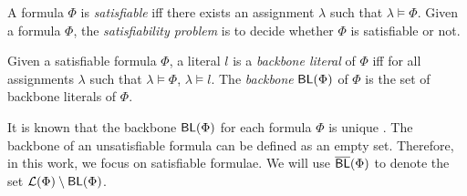 \iffalse
An assignment $\lambda$ is a \emph{model} of $\Phi$ if $\lambda\models \Phi$.
Given two models $\lambda_1$ and $\lambda_2$ of $\Phi$, $\lambda_2$ can be \emph{generated} from $\lambda_1$, denoted by $\lambda_1\Rightarrow_\Phi\lambda_2$, if there exists a literal $l$ such that $\lambda_2=\lambda_1[\neg l]$.
Let $\Rightarrow^*_\Phi$ denote the \emph{reflexive transitive} closure of $\Rightarrow_\Phi$.
Formally, for every model $\lambda$ of $\Phi$, $\lambda\Rightarrow^*_\Phi\lambda$ and $\lambda_1\Rightarrow^*_\Phi\lambda_3$ if $\lambda_1\Rightarrow^*_\Phi\lambda_2$ and $\lambda_2\Rightarrow^*_\Phi\lambda_3$.
A \emph{model cluster} $\cl_\Phi(\lambda)$ of $\lambda$ is the set of models $\{\lambda'\mid \lambda\Rightarrow^*_\Phi\lambda'\}$.
A literal $l$ is a \emph{frozen literal} in a model $\lambda$ of $\Phi$,
if $l$ takes the same value in all the models of $\cl_\Phi(\lambda)$. Let $\FL(\Phi,\lambda)$ denote the set of all the frozen literals
in the model $\lambda$ of $\Phi$. %
\fi

A formula $\Phi$ is \emph{satisfiable} iff there exists an assignment $\lambda$ such that $\lambda\models \Phi$.
Given a formula $\Phi$, the \emph{satisfiability problem} is to decide whether $\Phi$ is satisfiable or not.

\smallskip

\begin{definition}[Backbone]
\label{def:backbone}
Given a satisfiable formula $\Phi$, a literal $l$ is a \emph{backbone literal} of $\Phi$ iff for all assignments $\lambda$ such that $\lambda\models\Phi$,
$\lambda\models l$. The \emph{backbone} $\textsf{BL}(\Phi)$ of $\Phi$ is the set of backbone literals of $\Phi$.
\end{definition}

\iffalse
Since a backbone literal takes same value in all the models and a frozen literal takes same value in a model cluster instead of all the models,
we get that:

\begin{proposition}\label{prop:Frozen-backbone}
For any formula $\Phi$ and model $\lambda$ of $\Phi$, $\BL(\Phi)\subseteq\FL(\Phi,\lambda)$.
\end{proposition}
Computing $\FL(\Phi,\lambda)$ of a given model is in polynomial time. However, the generation of the first model in each $\cl_\Phi(\lambda)$ still needs a SAT testing.
\fi

It is known that the backbone $\textsf{BL}(\Phi)$ for each formula $\Phi$ is unique \cite{JLM15}.
The backbone of an unsatisfiable formula can be defined as an empty set. Therefore, in this work, we focus on satisfiable formulae.
We will use $\overline{\textsf{BL}}(\Phi)$ to denote the set
${\cal L}(\Phi)\setminus \textsf{BL}(\Phi)$.

